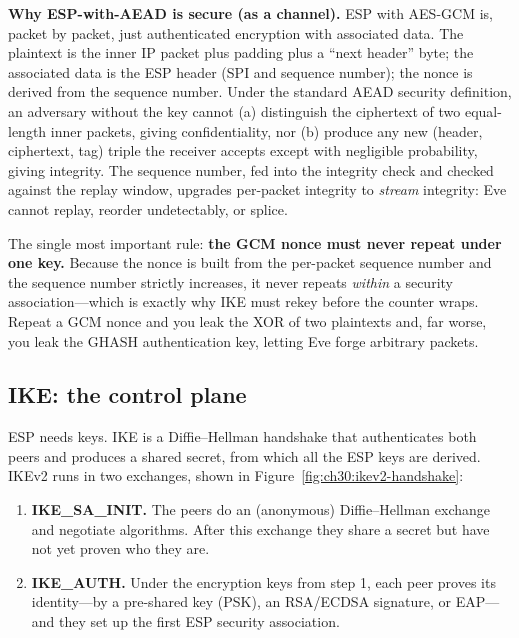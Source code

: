 \begin{whybox}
\textbf{Why ESP-with-AEAD is secure (as a channel).} ESP with AES-GCM is, packet by packet, just authenticated encryption with associated data. The plaintext is the inner IP packet plus padding plus a ``next header'' byte; the associated data is the ESP header (SPI and sequence number); the nonce is derived from the sequence number. Under the standard AEAD security definition, an adversary without the key cannot (a) distinguish the ciphertext of two equal-length inner packets, giving confidentiality, nor (b) produce any new (header, ciphertext, tag) triple the receiver accepts except with negligible probability, giving integrity. The sequence number, fed into the integrity check and checked against the replay window, upgrades per-packet integrity to \emph{stream} integrity: Eve cannot replay, reorder undetectably, or splice.

The single most important rule: \textbf{the GCM nonce must never repeat under one key.} Because the nonce is built from the per-packet sequence number and the sequence number strictly increases, it never repeats \emph{within} a security association---which is exactly why IKE must rekey before the counter wraps. Repeat a GCM nonce and you leak the XOR of two plaintexts and, far worse, you leak the GHASH authentication key, letting Eve forge arbitrary packets. 
\end{whybox}

\subsection{IKE: the control plane}

ESP needs keys. IKE is a Diffie--Hellman handshake that authenticates both peers and produces a shared secret, from which all the ESP keys are derived. IKEv2 runs in two exchanges, shown in Figure~\ref{fig:ch30:ikev2-handshake}:

\begin{enumerate}
\item \textbf{IKE\_SA\_INIT.} The peers do an (anonymous) Diffie--Hellman exchange and negotiate algorithms. After this exchange they share a secret but have not yet proven who they are.
\item \textbf{IKE\_AUTH.} Under the encryption keys from step 1, each peer proves its identity---by a pre-shared key (PSK), an RSA/ECDSA signature, or EAP---and they set up the first ESP security association.
\end{enumerate}

